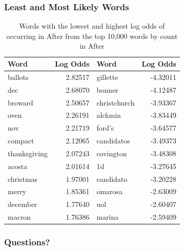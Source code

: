 \documentclass{beamer}
\begin{document}
\begin{frame}
\frametitle{Least and Most Likely Words}
	\begin{table}[t]
		\centering
		\small
		\begin{tabular}{lr|lr}
			\toprule
			Word &  Log Odds &  Word  & Log Odds \\
			\midrule
			ballots         &   2.82517  &  gillette        &  -4.32011\\
			dec             &   2.68070  &  bonner          &  -4.12487\\
			broward         &   2.50657  &  christchurch    &  -3.93367\\
			oven            &   2.26191  &  alckmin         &  -3.83449\\
			nov             &   2.21719  &  ford’s          &  -3.64577\\
			compact         &   2.12065  &  candidatos      &  -3.49373\\
			thanksgiving    &   2.07243  &  covington       &  -3.48308\\
			acosta          &   2.01614  &  1d              &  -3.27645\\
			christmas       &   1.97001  &  candidato       &  -3.20228\\
			merry           &   1.85361  &  omarosa         &  -2.63009\\
			december        &   1.77640  &  uol             &  -2.60407\\
			macron          &   1.76386  &  marina          &  -2.59409\\
			\bottomrule
		\end{tabular}
		\caption{Words with the lowest and highest log odds of occurring in After from the top 10,000 words by count in After}
	\end{table}
\end{frame}

\begin{frame}
\frametitle{Questions?}

\end{frame}
\end{document}
